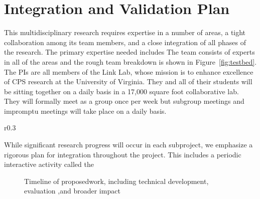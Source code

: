 \section{Integration and Validation Plan}
This multidisciplinary research requires expertise in a number of areas, a tight collaboration among its team members, and a close integration of all phases of the research. The primary expertise needed includes  The team consists of experts in all of the areas and the rough team breakdown is shown in Figure~\ref{fig:testbed}. The PIs are all members of the Link Lab, whose mission is to enhance excellence of CPS research at the University of Virginia. They and all of their students will be sitting together on a daily basis in a 17,000 square foot collaborative lab. They will formally meet as a group once per week but subgroup meetings and impromptu meetings will take place on a daily basis.

\begin{wrapfigure}{r}{0.3\linewidth}
\end{wrapfigure}

While significant research progress will occur in each subproject, we emphasize a rigorous plan for integration throughout the project. This includes a periodic interactive activity called the


\begin{figure}
    \centering
    \caption{Timeline of proposedwork, including technical development, evaluation ,and
  broader impact}
    \label{fig:timeline}
\end{figure}